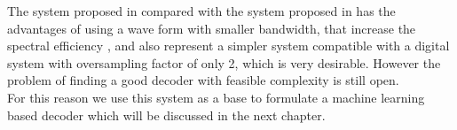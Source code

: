 The system proposed in \cite{Plabst_DD} compared with the system proposed in \cite{Tasbihi_Tukey} has the advantages of using a wave form with smaller bandwidth, that increase the spectral efficiency \cite{Plabst_DD}, and also represent a simpler system compatible with a digital system with oversampling factor of only 2, which is very desirable. However the problem of finding a good decoder with feasible complexity is still open. \\

For this reason we use this system as a base to formulate a machine learning based decoder which will be discussed in the next chapter.













